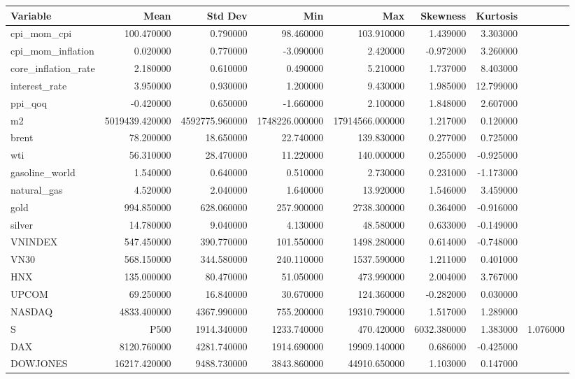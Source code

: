 \begin{tabular}{lrrrrrr}
\toprule
Variable & Mean & Std Dev & Min & Max & Skewness & Kurtosis \\
\midrule
cpi_mom_cpi & 100.470000 & 0.790000 & 98.460000 & 103.910000 & 1.439000 & 3.303000 \\
cpi_mom_inflation & 0.020000 & 0.770000 & -3.090000 & 2.420000 & -0.972000 & 3.260000 \\
core_inflation_rate & 2.180000 & 0.610000 & 0.490000 & 5.210000 & 1.737000 & 8.403000 \\
interest_rate & 3.950000 & 0.930000 & 1.200000 & 9.430000 & 1.985000 & 12.799000 \\
ppi_qoq & -0.420000 & 0.650000 & -1.660000 & 2.100000 & 1.848000 & 2.607000 \\
m2 & 5019439.420000 & 4592775.960000 & 1748226.000000 & 17914566.000000 & 1.217000 & 0.120000 \\
brent & 78.200000 & 18.650000 & 22.740000 & 139.830000 & 0.277000 & 0.725000 \\
wti & 56.310000 & 28.470000 & 11.220000 & 140.000000 & 0.255000 & -0.925000 \\
gasoline_world & 1.540000 & 0.640000 & 0.510000 & 2.730000 & 0.231000 & -1.173000 \\
natural_gas & 4.520000 & 2.040000 & 1.640000 & 13.920000 & 1.546000 & 3.459000 \\
gold & 994.850000 & 628.060000 & 257.900000 & 2738.300000 & 0.364000 & -0.916000 \\
silver & 14.780000 & 9.040000 & 4.130000 & 48.580000 & 0.633000 & -0.149000 \\
VNINDEX & 547.450000 & 390.770000 & 101.550000 & 1498.280000 & 0.614000 & -0.748000 \\
VN30 & 568.150000 & 344.580000 & 240.110000 & 1537.590000 & 1.211000 & 0.401000 \\
HNX & 135.000000 & 80.470000 & 51.050000 & 473.990000 & 2.004000 & 3.767000 \\
UPCOM & 69.250000 & 16.840000 & 30.670000 & 124.360000 & -0.282000 & 0.030000 \\
NASDAQ & 4833.400000 & 4367.990000 & 755.200000 & 19310.790000 & 1.517000 & 1.289000 \\
S&P500 & 1914.340000 & 1233.740000 & 470.420000 & 6032.380000 & 1.383000 & 1.076000 \\
DAX & 8120.760000 & 4281.740000 & 1914.690000 & 19909.140000 & 0.686000 & -0.425000 \\
DOWJONES & 16217.420000 & 9488.730000 & 3843.860000 & 44910.650000 & 1.103000 & 0.147000 \\

\end{tabular}
